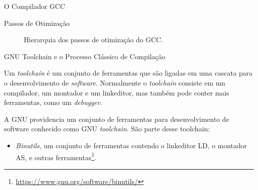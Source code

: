 \begin{section}{O Compilador GCC}
\begin{subsection}{Passos de Otimização}
\begin{figure}
\begin{center}
{\begin{tikzpicture}[node distance = 5cm, auto]
\end{tikzpicture}
}
\end{center}
\caption{Hierarquia dos passos de otimização do GCC.}
\label{fig:opt_uml}
\end{figure}


\end{subsection}

%
%


\begin{subsection}{GNU Toolchain e o Processo Clássico de Compilação}

    Um \textit{toolchain} é um conjunto de ferramentas que são ligadas em
uma cascata para o desenvolvimento de \textit{software}. Normalmente o
\textit{toolchain} consiste em um compilador, um montador e um linkeditor,
mas também pode conter mais ferramentas, como um \textit{debugger}.

A GNU providencia um conjunto de ferramentas para desenvolvimento de software
conhecido como GNU \textit{toolchain}. São parte desse toolchain:
\begin{itemize}
    \item \textit{Binutils}, um conjunto de ferramentas contendo o linkeditor
LD, o montador AS, e outras ferramentas\footnote{\url{https://www.gnu.org/software/binutils/}}.


\end{itemize}
\end{subsection}
\end{section}

